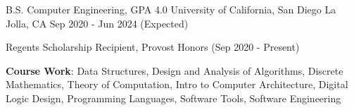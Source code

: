 

\begin{cventries}

  \cventry
    {B.S. Computer Engineering,  GPA 4.0} %
    {University of California, San Diego} %
    {La Jolla, CA} %
    {Sep 2020 - Jun 2024 (Expected)} %
    { \begin{cvitems}
        \item {Regents Scholarship Recipient, Provost Honors (Sep 2020 - Present)} 
        \item {\textbf{Course Work}: Data Structures, Design and Analysis of Algorithms, Discrete Mathematics, Theory of Computation, Intro to Computer Architecture, Digital Logic Design, Programming Languages, Software Tools, Software Engineering}
    \end{cvitems}
    } 
    
   
    
   

    
    

\end{cventries}
